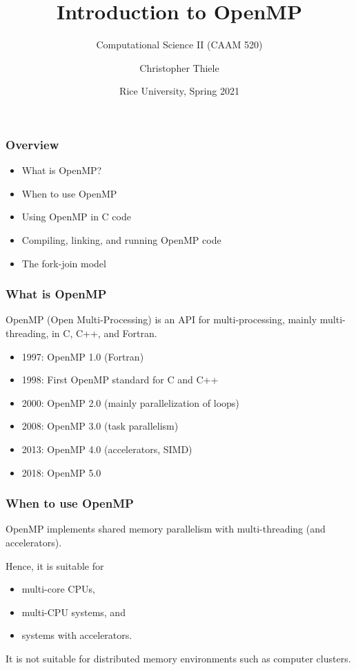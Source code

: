 \documentclass[12pt,t]{beamer}
\begin{document}
  \title{Introduction to OpenMP}
  \subtitle{Computational Science II (CAAM 520)}
  \author{Christopher Thiele}
  \date{Rice University, Spring 2021}

  \begin{frame}
    \titlepage
  \end{frame}


  \begin{frame}[fragile]
    \frametitle{Overview}

    \begin{itemize}
      \item What is OpenMP?
      \item When to use OpenMP
      \item Using OpenMP in C code
      \item Compiling, linking, and running OpenMP code
      \item The fork-join model
    \end{itemize}
  \end{frame}

  \begin{frame}[fragile]
    \frametitle{What is OpenMP}

    OpenMP (Open Multi-Processing) is an API for multi-processing, mainly multi-threading, in C, C++, and Fortran.

    \begin{itemize}
      \item 1997: OpenMP 1.0 (Fortran)
      \item 1998: First OpenMP standard for C and C++
      \item 2000: OpenMP 2.0 (mainly parallelization of loops)
      \item 2008: OpenMP 3.0 (task parallelism)
      \item 2013: OpenMP 4.0 (accelerators, SIMD)
      \item 2018: OpenMP 5.0
    \end{itemize}
  \end{frame}

  \begin{frame}[fragile]
    \frametitle{When to use OpenMP}

    OpenMP implements shared memory parallelism with multi-threading (and accelerators).

    Hence, it is suitable for
    \begin{itemize}
      \item multi-core CPUs,
      \item multi-CPU systems, and
      \item systems with accelerators.
    \end{itemize}

    It is not suitable for distributed memory environments such as computer clusters.
  \end{frame}
\end{document}
